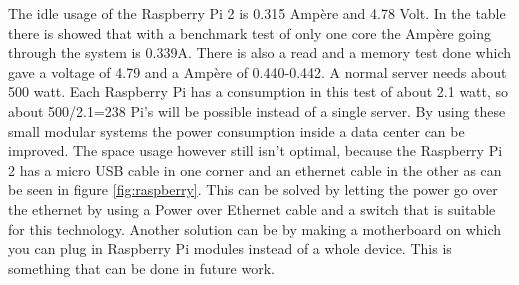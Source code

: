 \documentclass{sig-alternate-br}
\begin{document}
The idle usage of the Raspberry Pi 2 is 0.315 Ampère and 4.78 Volt. In the table there is showed that with a benchmark test of only one core the Ampère going through the system is  0.339A. There is also a read  and a memory test done which gave a voltage of 4.79 and a Ampère of 0.440-0.442.  A normal server needs about 500 watt. Each Raspberry Pi has a consumption in this test of about 2.1 watt, so about 500/2.1=238 Pi's will be possible instead of a single server. By using these small modular systems the power consumption inside a data center can be improved. The space usage however still isn't optimal, because the Raspberry Pi 2 has a micro USB cable  in one corner and an ethernet cable in the other as can be seen in figure \ref{fig:raspberry}. 
This can be solved by letting the power go over the ethernet by using a Power over Ethernet cable and a switch that is suitable for this technology. Another solution can be by making a motherboard on which you can plug in Raspberry Pi modules instead of a whole device. This is something that can be done in future work. 
\end{document}
